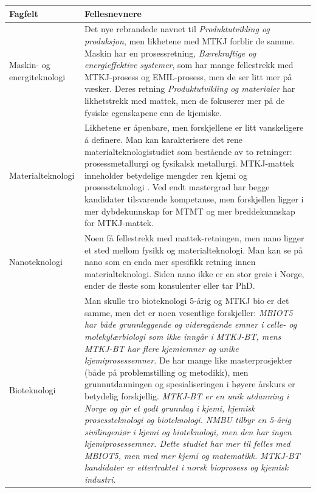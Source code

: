 \newpage

\begin{table}[H]
    \centering
    \begin{tabular}{p{3cm}p{10cm}}
        \toprule
        Fagfelt & Fellesnevnere \\
        \midrule
        Maskin- og energiteknologi & Det nye rebrandede navnet til \textit{Produktutvikling og produksjon}, men likhetene med MTKJ forblir de samme. Maskin har en prosessretning, \textit{Bærekraftige og energieffektive systemer}, som har mange fellestrekk med MTKJ-prosess og EMIL-prosess, men de ser litt mer på væsker. Deres retning \textit{Produktutvikling og materialer} har likhetstrekk med mattek, men de fokuserer mer på de fysiske egenskapene enn de kjemiske. \\
        
        Materialteknologi & Likhetene er åpenbare, men forskjellene er litt vanskeligere å definere. Man kan karakterisere det rene materialteknologistudiet som bestående av to retninger: prosessmetallurgi og fysikalsk metallurgi. MTKJ-mattek inneholder betydelige mengder ren kjemi og prosessteknologi \cite{MTKJ-MTMT}. Ved endt mastergrad har begge kandidater tilsvarende kompetanse, men forskjellen ligger i mer dybdekunnskap for MTMT og mer breddekunnskap for MTKJ-mattek. \\
        
        Nanoteknologi & Noen få fellestrekk med mattek-retningen, men nano ligger et sted mellom fysikk og materialteknologi. Man kan se på nano som en enda mer spesifikk retning innen materialteknologi. Siden nano ikke er en stor greie i Norge, ender de fleste som konsulenter eller tar PhD. \\
        
        Bioteknologi & Man skulle tro bioteknologi 5-årig og MTKJ bio er det samme, men det er noen vesentlige forskjeller: \textit{MBIOT5 har både grunnleggende og videregående emner i celle- og molekylærbiologi som ikke inngår i MTKJ-BT, mens MTKJ-BT har flere kjemiemner og unike kjemiprosessemner.} De har mange like masterprosjekter (både på problemstilling og metodikk), men grunnutdanningen og spesialiseringen i høyere årskurs er betydelig forskjellig. \textit{MTKJ-BT er en unik utdanning i Norge og gir et godt grunnlag i kjemi, kjemisk prosessteknologi og bioteknologi. NMBU tilbyr en 5-årig sivilingeniør i kjemi og bioteknologi, men den har ingen kjemiprosessemner. Dette studiet har mer til felles med MBIOT5, men med mer kjemi og matematikk. MTKJ-BT kandidater er ettertraktet i norsk bioprosess og kjemisk industri.} \cite{MTKJ-MTMT} \\
        

\end{tabular}
\end{table}
